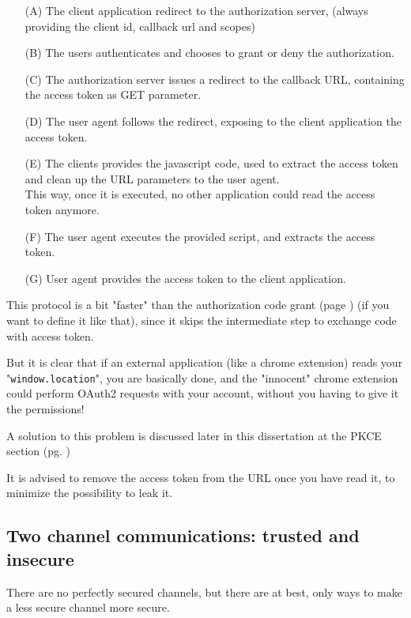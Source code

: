 \begin{enumerate}
    \item[(A)]
        The client application redirect to the authorization server, (always
        providing the client id, callback url and scopes)
    \item[(B)]
        The users authenticates and chooses to grant or deny the
        authorization.
    \item[(C)]
        The authorization server issues a redirect to the callback URL,
        containing the access token as GET parameter.

    \item[(D)]
        The user agent follows the redirect, exposing to the client application the access token.
    \item[(E)]
        The clients provides the javascript code, used to extract the access token and clean up the
        URL parameters to the user agent.
        \\
        This way, once it is executed, no other application could read the access token anymore.
    \item[(F)]
        The user agent executes the provided script, and extracts the access token.
    \item [(G)]
        User agent provides the access token to the client application.
\end{enumerate}


This protocol is a bit "faster" than the authorization code grant (page
\pageref{sec:auth-code}) (if you want to define it like that), since it skips
the intermediate step to exchange code with access
token.

But it is clear that if an external application (like a chrome extension) reads
your "\texttt{window.location}", you are basically done, and the "innocent" chrome
extension could perform OAuth2 requests with your account, without you having to
give it the permissions!

A solution to this problem is discussed later in this dissertation at the PKCE
section (pg. \pageref{pkce})

It is advised to remove the access token from the URL once you have read it, to
minimize the possibility to leak it.

\subsection{Two channel communications: trusted and insecure}
There are no perfectly secured channels, but there are at
best, only ways to make a less secure channel more secure.


